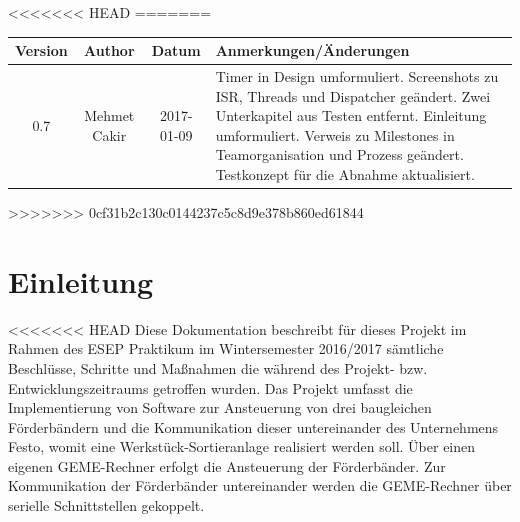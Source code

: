 \documentclass[a4paper, 11pt]{article}
\begin{document}
\newpage

<<<<<<< HEAD
=======
\begin{table}[H]
    \begin{tabularx}{\textwidth}{|c|c|c|X|}
    \hline
    \textbf{Version} & \textbf{Author} & \textbf{Datum} & \centering \arraybackslash \textbf{Anmerkungen/Änderungen}\\
    \hline
    0.7&Mehmet Cakir&2017-01-09&Timer in Design umformuliert. Screenshots zu ISR, Threads und Dispatcher geändert. Zwei Unterkapitel aus Testen entfernt. Einleitung umformuliert. Verweis zu Milestones in Teamorganisation und Prozess geändert. Testkonzept für die Abnahme aktualisiert.\\
    \hline
    \end{tabularx}
\label{changes}
\end{table}

\newpage

>>>>>>> 0cf31b2c130c0144237c5c8d9e378b860ed61844
\tableofcontents

\newpage

\section{Einleitung}
<<<<<<< HEAD
Diese Dokumentation beschreibt für dieses Projekt im Rahmen des ESEP Praktikum im Wintersemester 2016/2017 sämtliche Beschlüsse, Schritte und Maßnahmen die während des Projekt- bzw. Entwicklungszeitraums getroffen wurden. Das Projekt umfasst die Implementierung von Software zur Ansteuerung von drei baugleichen Förderbändern und die Kommunikation dieser untereinander des Unternehmens Festo, womit eine Werkstück-Sortieranlage realisiert werden soll. Über einen eigenen GEME-Rechner erfolgt die Ansteuerung der Förderbänder. Zur Kommunikation der Förderbänder untereinander werden die GEME-Rechner über serielle Schnittstellen gekoppelt.
\end{document}
